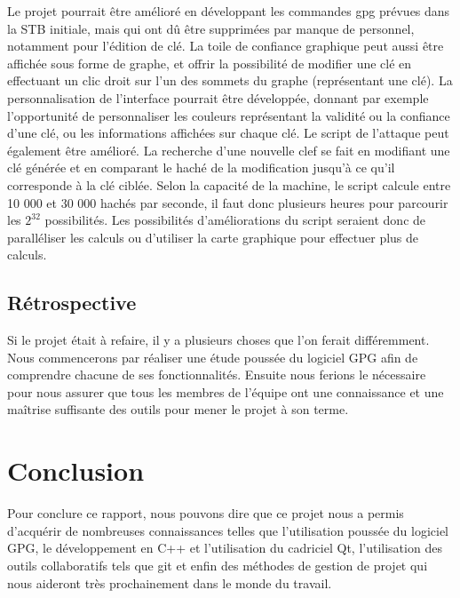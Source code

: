 \documentclass{../res/univ-projet}
\begin{document}
    Le projet pourrait être amélioré en développant les commandes gpg prévues dans la STB initiale, mais qui ont dû être supprimées par manque de personnel, notamment pour l'édition de clé. 
    La toile de confiance graphique peut aussi être affichée sous forme de graphe, et offrir la possibilité de modifier une clé en effectuant un clic droit sur l'un des sommets du graphe (représentant une clé).
    La personnalisation de l'interface pourrait être développée, donnant par exemple l'opportunité de personnaliser les couleurs représentant la validité ou la confiance d'une clé, ou les informations affichées sur chaque clé.
    Le script de l'attaque peut également être amélioré. La recherche d'une nouvelle clef se fait en modifiant une clé générée et en comparant le haché de la modification jusqu'à ce qu'il corresponde à la clé ciblée. Selon la capacité de la machine, le script calcule entre 10 000 et 30 000 hachés par seconde, il faut donc plusieurs heures pour parcourir les $2^{32}$ possibilités. Les possibilités d'améliorations du script seraient donc de paralléliser les calculs ou d'utiliser la carte graphique pour effectuer plus de calculs.

  \subsection{Rétrospective}
	Si le projet était à refaire, il y a plusieurs choses que l'on ferait différemment. Nous commencerons par réaliser une étude poussée du logiciel GPG afin de comprendre chacune de ses fonctionnalités. Ensuite nous ferions le nécessaire pour nous assurer que tous les membres de l'équipe ont une connaissance et une maîtrise suffisante des outils pour mener le projet à son terme.


\section{Conclusion}

	Pour conclure ce rapport, nous pouvons dire que ce projet nous a permis d'acquérir de nombreuses connaissances telles que l'utilisation poussée du logiciel GPG, le développement en C++ et l'utilisation du cadriciel Qt, l'utilisation des outils collaboratifs tels que git et enfin des méthodes de gestion de projet qui nous aideront très prochainement dans le monde du travail.
\end{document}
